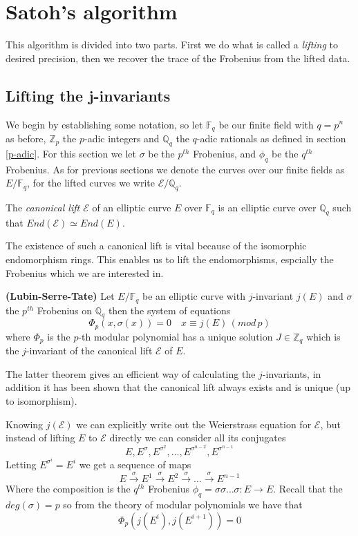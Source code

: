 \section{Satoh's algorithm} \label{satoh}
This algorithm is divided into two parts. First we do what is called a \emph{lifting} to desired
precision, then we recover the trace of the Frobenius from the lifted data.

\subsection{Lifting the j-invariants}
We begin by establishing some notation, so let $\mathbb{F}_q$ be our finite field with $q=p^n$ as before,
$\mathbb{Z}_p$ the $p$-adic integers and $\mathbb{Q}_q$ the $q$-adic rationals as defined in section \ref{p-adic}.
For this section we let $\sigma$ be the $p^{th}$ Frobenius, and $\phi_q$ be the $q^{th}$ Frobenius.
As for previous sections we denote the curves over our finite fields as $E/\mathbb{F}_q$,
for the lifted curves we write $\mathscr{E}/\mathbb{Q}_q$.

\begin{mydef}
 The \emph{canonical lift $\mathscr{E}$} of an elliptic curve $E$ over $\mathbb{F}_q$ is
an elliptic curve over $\mathbb{Q}_q$ such that $End(\mathscr{E}) \simeq End(E)$.
\end{mydef}

The existence of such a canonical lift is vital because of the isomorphic endomorphism rings. This
enables us to lift the endomorphisms, espcially the Frobenius which we are interested in.

\begin{thm}
 \textbf{(Lubin-Serre-Tate)} Let $E/\mathbb{F}_q$ be an elliptic curve with $j$-invariant $j(E)$ and
$\sigma$ the $p^{th}$ Frobenius on $\mathbb{Q}_q$ then the system of equations
$$ \Phi_p(x, \sigma(x)) = 0 \quad x \equiv j(E) \, (mod\, p)$$
where $\Phi_p$ is the $p$-th modular polynomial has a unique solution $J \in \mathbb{Z}_q$ 
which is the $j$-invariant of the canonical lift $\mathscr{E}$ of $E$.
\end{thm}
The latter theorem gives an efficient way of calculating the $j$-invariants, in addition it has
been shown \cite{Deuring} that the canonical lift always exists and is unique (up to isomorphism).

Knowing $j(\mathscr{E})$ we can explicitly write out the Weierstrass equation for $\mathscr{E}$, but
instead of lifting $E$ to $\mathscr{E}$ directly we can consider all its conjugates
$$E, E^\sigma, E^{\sigma^2}, \ldots, E^{\sigma^{n-2}}, E^{\sigma^{n-1}} $$
Letting $E^{\sigma^i} = E^i $ we get a sequence of maps
$$ E \overset{\sigma}{\rightarrow} E^1 \overset{\sigma}{\rightarrow} E^2 \overset{\sigma}{\rightarrow}
\ldots \overset{\sigma}{\rightarrow} E^{n-1} $$
Where the composition is the $q^{th}$ Frobenius $\phi_q = \sigma \sigma \ldots \sigma: E \rightarrow E$.
Recall that the $deg(\sigma) = p$ so from the theory of modular polynomials we have that
$$ \Phi_p(j(E^i), j(E^{i+1})) = 0 $$



